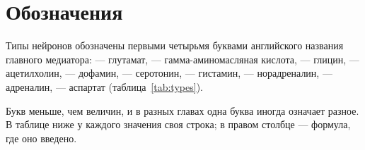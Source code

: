 \chapter{Обозначения}
\label{sec:notation}

Типы нейронов обозначены первыми четырьмя буквами английского названия главного медиатора:  --- глутамат,  --- гамма-аминомасляная кислота,  --- глицин,  --- ацетилхолин,  --- дофамин,  --- серотонин,  --- гистамин,  --- норадреналин,  --- адреналин,  --- аспартат (таблица~\ref{tab:types}).

Букв меньше, чем величин, и в разных главах одна буква иногда означает разное. В таблице ниже у каждого значения своя строка; в правом столбце --- формула, где оно введено.

